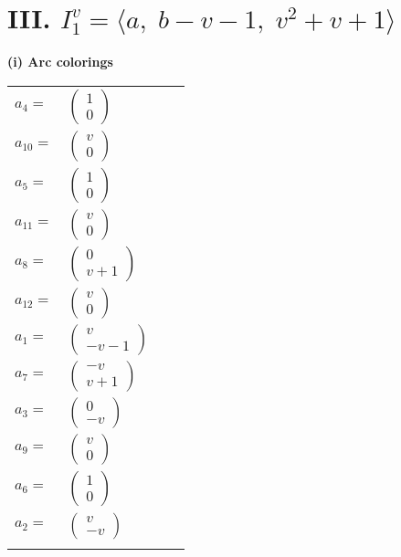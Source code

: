 \documentclass[1p]{elsarticle_modified}
\theoremstyle{definition}
\begin{document}
\centering \section*{III. $I^v_{1}= \langle a,\;b- v-1,\;v^2+v+1 \rangle$}
\flushleft \textbf{(i) Arc colorings}\\
\begin{tabular}{m{7pt} m{180pt} m{7pt} m{180pt} }
\flushright $a_{4}=$&$\begin{pmatrix}1\\0\end{pmatrix}$ \\
\flushright $a_{10}=$&$\begin{pmatrix}v\\0\end{pmatrix}$ \\
\flushright $a_{5}=$&$\begin{pmatrix}1\\0\end{pmatrix}$ \\
\flushright $a_{11}=$&$\begin{pmatrix}v\\0\end{pmatrix}$ \\
\flushright $a_{8}=$&$\begin{pmatrix}0\\v+1\end{pmatrix}$ \\
\flushright $a_{12}=$&$\begin{pmatrix}v\\0\end{pmatrix}$ \\
\flushright $a_{1}=$&$\begin{pmatrix}v\\- v-1\end{pmatrix}$ \\
\flushright $a_{7}=$&$\begin{pmatrix}- v\\v+1\end{pmatrix}$ \\
\flushright $a_{3}=$&$\begin{pmatrix}0\\- v\end{pmatrix}$ \\
\flushright $a_{9}=$&$\begin{pmatrix}v\\0\end{pmatrix}$ \\
\flushright $a_{6}=$&$\begin{pmatrix}1\\0\end{pmatrix}$ \\
\flushright $a_{2}=$&$\begin{pmatrix}v\\- v\end{pmatrix}$\\&\end{tabular}
\end{document}
